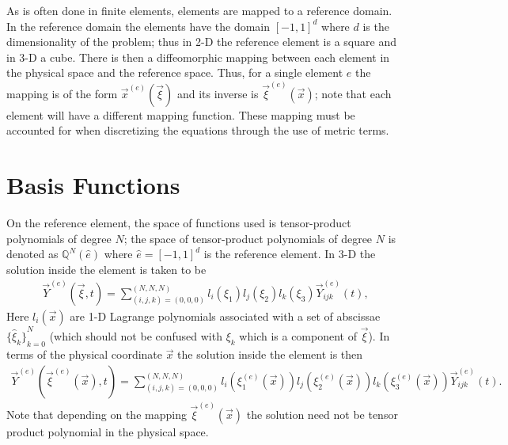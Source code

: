 \documentclass{report}
\begin{document}
As is often done in finite elements, elements are mapped to a reference domain.
In the reference domain the elements have the domain ${[-1, 1]}^d$ where $d$ is
the dimensionality of the problem; thus in 2-D the reference element is a square
and in 3-D a cube. There is then a diffeomorphic mapping between each element in
the physical space and the reference space. Thus, for a single element $e$ the
mapping is of the form $\vec{x}^{(e)}(\vec{\xi})$ and its inverse is
$\vec{\xi}^{(e)}(\vec{x})$; note that each element will have a different mapping
function. These mapping must be accounted for when discretizing the equations
through the use of metric terms.

\section{Basis Functions}
On the reference element, the space of functions used is tensor-product
polynomials of degree $N$; the space of tensor-product polynomials of degree $N$
is denoted as $\mathbb{Q}^{N}(\hat{e})$ where $\hat{e} = {[-1, 1]}^d$ is the
reference element. In 3-D the solution inside the element is taken to be
\begin{align}
  \vec{Y}^{(e)}(\vec{\xi}, t) = \sum_{(i,j,k) = (0,0,0)}^{(N,N,N)}
  l_{i}(\xi_{1}) l_{j}(\xi_{2}) l_{k}(\xi_{3})
  \vec{Y}_{ijk}^{(e)}(t),
\end{align}
Here $l_{i}(\vec{x})$ are 1-D Lagrange polynomials associated with a set of
abscissae ${\{\hat{\xi}_{k}\}}_{k=0}^{N}$ (which should not be confused with
$\xi_{k}$ which is a component of $\vec{\xi}$). In terms of the physical
coordinate $\vec{x}$ the solution inside the element is then
\begin{align}
  \vec{Y}^{(e)}(\vec{\xi}^{(e)}(\vec{x}), t) = \sum_{(i,j,k) = (0,0,0)}^{(N,N,N)}
  l_{i}(\xi_{1}^{(e)}(\vec{x})) l_{j}(\xi_{2}^{(e)}(\vec{x}))
  l_{k}(\xi_{3}^{(e)}(\vec{x}))
  \vec{Y}_{ijk}^{(e)}(t).
\end{align}
Note that depending on the mapping $\vec{\xi}^{(e)}(\vec{x})$ the solution need
not be tensor product polynomial in the physical space.
\end{document}
